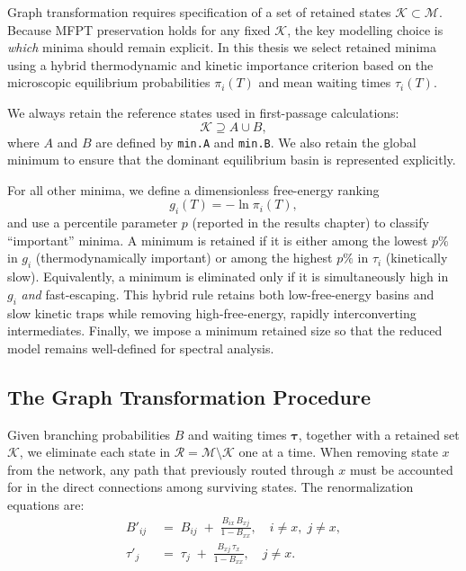 Graph transformation requires specification of a set of retained states
$\mathcal{K} \subset \mathcal{M}$. Because MFPT preservation holds for any fixed
$\mathcal{K}$, the key modelling choice is \emph{which} minima should remain explicit.
In this thesis we select retained minima using a hybrid thermodynamic and kinetic
importance criterion based on the microscopic equilibrium probabilities $\pi_i(T)$
and mean waiting times $\tau_i(T)$.

We always retain the reference states used in first-passage calculations:
\begin{equation}\label{eq:keep-AB}
  \mathcal{K} \supseteq A \cup B,
\end{equation}
where $A$ and $B$ are defined by \texttt{min.A} and \texttt{min.B}. We also retain
the global minimum to ensure that the dominant equilibrium basin is represented
explicitly.

For all other minima, we define a dimensionless free-energy ranking
\begin{equation}\label{eq:free-energy-rank}
  g_i(T) = -\ln \pi_i(T),
\end{equation}
and use a percentile parameter $p$ (reported in the results chapter) to classify
``important'' minima. A minimum is retained if it is either among the lowest $p\%$
in $g_i$ (thermodynamically important) or among the highest $p\%$ in $\tau_i$
(kinetically slow). Equivalently, a minimum is eliminated only if it is simultaneously
high in $g_i$ \emph{and} fast-escaping. This hybrid rule retains both low-free-energy
basins and slow kinetic traps while removing high-free-energy, rapidly interconverting
intermediates. Finally, we impose a minimum retained size so that the reduced model
remains well-defined for spectral analysis.


\subsection{The Graph Transformation Procedure}\label{subsec:gt-procedure}

Given branching probabilities $B$ and waiting times $\boldsymbol{\tau}$, together with
a retained set $\mathcal{K}$, we eliminate each state in
$\mathcal{R} = \mathcal{M} \setminus \mathcal{K}$ one at a time. When removing state
$x$ from the network, any path that previously routed through $x$ must be accounted for
in the direct connections among surviving states. The renormalization equations are:
\begin{align}
  B'_{ij}
  &\;=\; B_{ij} \;+\; \frac{B_{ix}\, B_{xj}}{1 - B_{xx}},
  \quad i \neq x,\; j \neq x,
  \label{eq:gt-branching}
  \\[6pt]
  \tau'_j
  &\;=\; \tau_j \;+\; \frac{B_{xj}\,\tau_x}{1 - B_{xx}},
  \quad j \neq x.
  \label{eq:gt-waiting}
\end{align}

